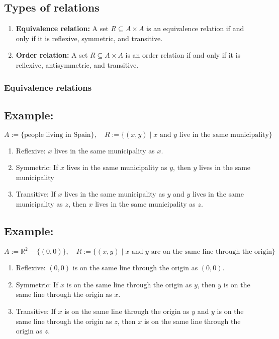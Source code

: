 \documentclass[11pt]{article}
\begin{document}
\subsection{Types of relations}
\begin{enumerate}
    \item \textbf{Equivalence relation:} A set $R \subseteq A \times A$ is an equivalence relation if and only if it is reflexive, symmetric, and transitive.
    \item \textbf{Order relation:} A set $R \subseteq A \times A$ is an order relation if and only if it is reflexive, antisymmetric, and transitive.
\end{enumerate}

\subsubsection{Equivalence relations}
\subsection*{Example:}
\[
A := \{\text{people living in Spain}\}, \quad R := \{(x,y) \mid x \text{ and } y \text{ live in the same municipality}\}
\]
\begin{enumerate}
    \item Reflexive: $x$ lives in the same municipality as $x$.
    \item Symmetric: If $x$ lives in the same municipality as $y$, then $y$ lives in the same municipality
    \item Transitive: If $x$ lives in the same municipality as $y$ and $y$ lives in the same municipality as $z$, then $x$ lives in the same municipality as $z$.
\end{enumerate}

\subsection*{Example:}
\[
A := \mathbb{R}^2 - \{(0,0)\}, \quad R := \{(x,y) \mid x \text{ and } y \text{ are on the same line through the origin}\}
\]
\begin{enumerate}
    \item Reflexive: $(0,0)$ is on the same line through the origin as $(0,0)$.
    \item Symmetric: If $x$ is on the same line through the origin as $y$, then $y$ is on the same line through the origin as $x$.
    \item Transitive: If $x$ is on the same line through the origin as $y$ and $y$ is on the same line through the origin as $z$, then $x$ is on the same line through the origin as $z$.
\end{enumerate}
\end{document}
